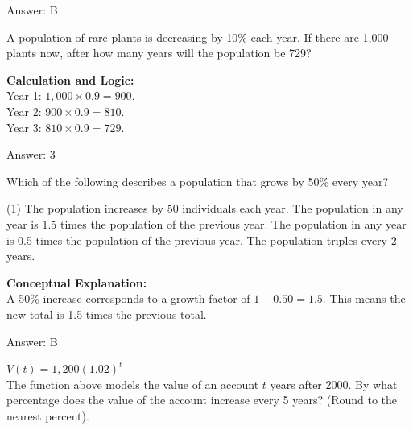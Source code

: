 \documentclass[11pt,paper=a4,answers]{exam}
\begin{document}
\begin{questions}
\begin{solution}
\vspace{25pt}

Answer: \colorbox{yellow!100}{B}
\end{solution}

\vspace{40pt}

\question
A population of rare plants is decreasing by 10\% each year. If there are 1,000 plants now, after how many years will the population be 729?

\begin{solution}
\textbf{Calculation and Logic:} \\
Year 1: $1,000 \times 0.9 = 900$. \\
Year 2: $900 \times 0.9 = 810$. \\
Year 3: $810 \times 0.9 = 729$.

\vspace{25pt}

Answer: \colorbox{yellow!100}{3}
\end{solution}

\vspace{40pt}

\question
Which of the following describes a population that grows by 50\% every year?
\begin{tasks}(1)
    \task The population increases by 50 individuals each year.
    \task The population in any year is 1.5 times the population of the previous year.
    \task The population in any year is 0.5 times the population of the previous year.
    \task The population triples every 2 years.
\end{tasks}

\begin{solution}
\textbf{Conceptual Explanation:} \\
A 50\% increase corresponds to a growth factor of $1 + 0.50 = 1.5$. This means the new total is 1.5 times the previous total.

\vspace{25pt}

Answer: \colorbox{yellow!100}{B}
\end{solution}

\vspace{40pt}

\question
$V(t) = 1,200(1.02)^t$ \\
The function above models the value of an account $t$ years after 2000. By what percentage does the value of the account increase every 5 years? (Round to the nearest percent).


\end{questions}
\end{document}
